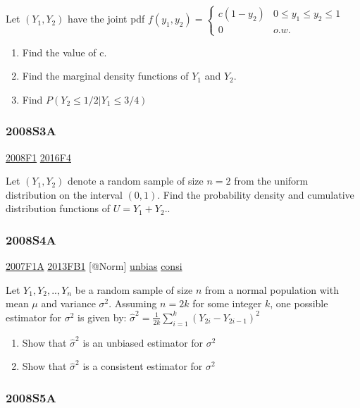 \documentclass[10pt,twocolumn,portrait]{article}
\begin{document}
Let \((Y_1,Y_2)\) have the joint pdf
\(f(y_1,y_2)=\begin{cases}c(1-y_2)&0\le y_1\le y_2\le 1\\0& o.w.\end{cases}\)

\begin{enumerate}
\def\labelenumi{(\alph{enumi})}
\item
  Find the value of c.
\item
  Find the marginal density functions of \(Y_1\) and \(Y_2\).
\item
  Find \(P(Y_2\le1/2|Y_1\le3/4)\)
\end{enumerate}

\hypertarget{s3a}{%
\subsubsection{2008S3A}\label{s3a}}

\protect\hyperlink{f1-3}{2008F1} \protect\hyperlink{f4-6}{2016F4}

Let \((Y_1,Y_2)\) denote a random sample of size \(n=2\) from the
uniform distribution on the interval \((0, 1)\). Find the probability
density and cumulative distribution functions of \(U=Y_1+Y_2\)..

\hypertarget{s4a}{%
\subsubsection{2008S4A}\label{s4a}}

\protect\hyperlink{f1a}{2007F1A} \protect\hyperlink{fb1-2}{2013FB1}
{[}@Norm{]} \protect\hyperlink{section-4}{unbias}
\protect\hyperlink{section-8}{consi}

Let \(Y_1,Y_2,..,Y_{n}\) be a random sample of size \(n\) from a normal
population with mean \(\mu\) and variance \(\sigma^2\). Assuming
\(n=2k\) for some integer \(k\), one possible estimator for \(\sigma^2\)
is given by: \(\hat\sigma^2=\frac1{2k}\sum_{i=1}^k(Y_{2i}-Y_{2i-1})^2\)

\begin{enumerate}
\def\labelenumi{(\alph{enumi})}
\item
  Show that \(\hat\sigma^2\) is an unbiased estimator for \(\sigma^2\)
\item
  Show that \(\hat\sigma^2\) is a consistent estimator for \(\sigma^2\)
\end{enumerate}

\hypertarget{s5a}{%
\subsubsection{2008S5A}\label{s5a}}
\end{document}
